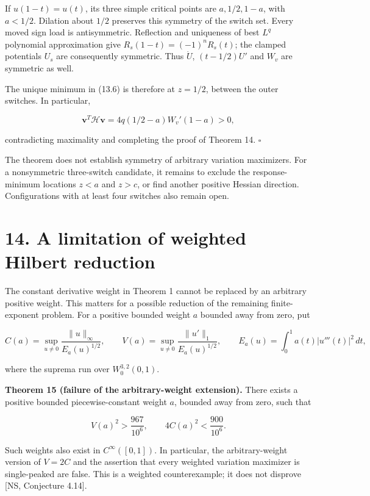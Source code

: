 \documentclass[11pt]{article}
\begin{document}
If \(u(1-t)=u(t)\), its three simple critical points are \(a,1/2,1-a\),
with \(a<1/2\). Dilation about \(1/2\) preserves this symmetry of the
switch set. Every moved sign load is antisymmetric. Reflection and
uniqueness of best \(L^q\) polynomial approximation give
\(R_s(1-t)=(-1)^nR_s(t)\); the clamped potentials \(U_s\) are
consequently symmetric. Thus \(\dot U\), \((t-1/2)U'\) and \(W_v\) are
symmetric as well.

The unique minimum in (13.6) is therefore at \(z=1/2\), between the
outer switches. In particular,

\[
\mathbf v^T\mathcal H\mathbf v
=4q(1/2-a)W_v'(1-a)>0,
\tag{13.8}
\]

contradicting maximality and completing the proof of Theorem 14.
\(\square\)

The theorem does not establish symmetry of arbitrary variation
maximizers. For a nonsymmetric three-switch candidate, it remains to
exclude the response-minimum locations \(z<a\) and \(z>c\), or find
another positive Hessian direction. Configurations with at least four
switches also remain open.

\section{14. A limitation of weighted Hilbert
reduction}\label{a-limitation-of-weighted-hilbert-reduction}

The constant derivative weight in Theorem 1 cannot be replaced by an
arbitrary positive weight. This matters for a possible reduction of the
remaining finite-exponent problem. For a positive bounded weight \(a\)
bounded away from zero, put

\[
C(a)=\sup_{u\ne0}\frac{\|u\|_\infty}{E_a(u)^{1/2}},\qquad
V(a)=\sup_{u\ne0}\frac{\|u'\|_1}{E_a(u)^{1/2}},\qquad
E_a(u)=\int_0^1a(t)|u'''(t)|^2\,dt,
\tag{14.1}
\]

where the suprema run over \(W_0^{3,2}(0,1)\).

\textbf{Theorem 15 (failure of the arbitrary-weight extension).} There
exists a positive bounded piecewise-constant weight \(a\), bounded away
from zero, such that

\[
V(a)^2>\frac{967}{10^6},\qquad
4C(a)^2<\frac{900}{10^6}.
\tag{14.2}
\]

Such weights also exist in \(C^\infty([0,1])\). In particular, the
arbitrary-weight version of \(V=2C\) and the assertion that every
weighted variation maximizer is single-peaked are false. This is a
weighted counterexample; it does not disprove {[}NS, Conjecture 4.14{]}.
\end{document}
